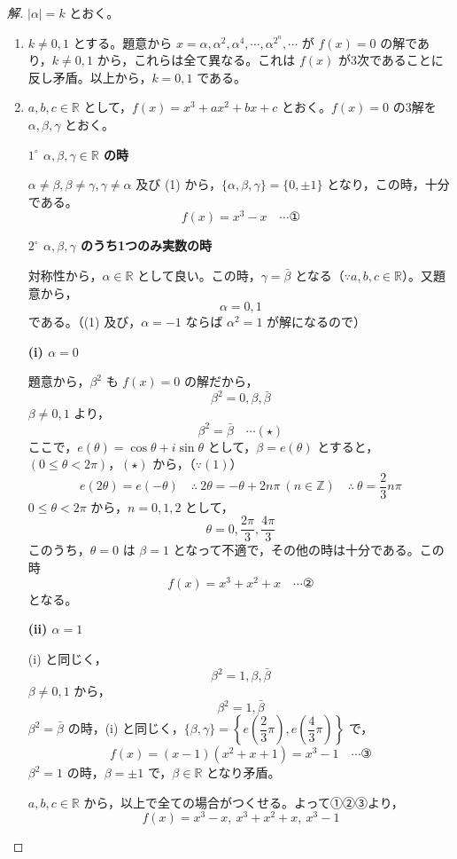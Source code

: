 \documentclass[../main.tex]{subfiles}
\begin{document}
\begin{proof}[解]
  $|\alpha|=k$ とおく。

  \begin{enumerate}
    \item[(1)] $k\ne0,1$ とする。題意から $x=\alpha,\alpha^2,\alpha^4,\cdots,\alpha^{2^n},\cdots$ が $f(x)=0$ の解であり，$k\ne0,1$ から，これらは全て異なる。これは $f(x)$ が3次であることに反し矛盾。以上から，$k=0,1$ である。

    \item[(2)] $a,b,c\in\mathbb{R}$ として，$f(x)=x^3+ax^2+bx+c$ とおく。$f(x)=0$ の3解を $\alpha,\beta,\gamma$ とおく。

      \textbf{$1^\circ$ $\alpha,\beta,\gamma\in\mathbb{R}$ の時}

      $\alpha\ne\beta,\beta\ne\gamma,\gamma\ne\alpha$ 及び (1) から，$\{\alpha,\beta,\gamma\}=\{0,\pm1\}$ となり，この時，十分である。
      \[
        f(x)=x^3-x \quad \cdots \text{①}
      \]

      \textbf{$2^\circ$ $\alpha,\beta,\gamma$ のうち1つのみ実数の時}

      対称性から，$\alpha\in\mathbb{R}$ として良い。この時，$\gamma=\bar\beta$ となる（$\because a,b,c\in\mathbb{R}$）。又題意から，
      \[
        \alpha=0,1
      \]
      である。（(1) 及び，$\alpha=-1$ ならば $\alpha^2=1$ が解になるので）

      \textbf{(i) $\alpha=0$}

      題意から，$\beta^2$ も $f(x)=0$ の解だから，
      \[
        \beta^2=0,\beta,\bar\beta
      \]
      $\beta\ne0,1$ より，
      \[
        \beta^2=\bar\beta \quad \cdots (\star)
      \]
      ここで，$e(\theta)=\cos\theta+i\sin\theta$ として，$\beta=e(\theta)$ とすると，$(0\le\theta<2\pi)$，$(\star)$ から，（$\because(1)$）
      \[
        e(2\theta)=e(-\theta) \quad\therefore\ 2\theta=-\theta+2n\pi\ (n\in\mathbb{Z}) \quad\therefore\ \theta=\frac{2}{3}n\pi
      \]
      $0\le\theta<2\pi$ から，$n=0,1,2$ として，
      \[
        \theta=0,\frac{2\pi}{3},\frac{4\pi}{3}
      \]
      このうち，$\theta=0$ は $\beta=1$ となって不適で，その他の時は十分である。この時
      \[
        f(x)=x^3+x^2+x \quad \cdots \text{②}
      \]
      となる。

      \textbf{(ii) $\alpha=1$}

      (i) と同じく，
      \[
        \beta^2=1,\beta,\bar\beta
      \]
      $\beta\ne0,1$ から，
      \[
        \beta^2=1,\bar\beta
      \]
      $\beta^2=\bar\beta$ の時，(i) と同じく，$\{\beta,\gamma\}=\left\{e\left(\dfrac{2}{3}\pi\right),e\left(\dfrac{4}{3}\pi\right)\right\}$ で，
      \[
        f(x)=(x-1)(x^2+x+1)=x^3-1 \quad \cdots \text{③}
      \]
      $\beta^2=1$ の時，$\beta=\pm1$ で，$\beta\in\mathbb{R}$ となり矛盾。

      $a,b,c\in\mathbb{R}$ から，以上で全ての場合がつくせる。よって①②③より，
      \[
        f(x)=x^3-x,\ x^3+x^2+x,\ x^3-1
      \]
  \end{enumerate}
\end{proof}
\end{document}
